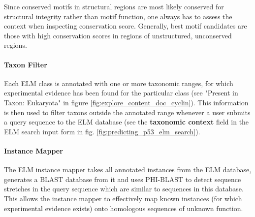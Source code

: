 \documentclass[12pt]{article}
\newcommand\button[1]{%
	\textbf{#1}%
}
\begin{document}
Since conserved motifs in structural regions are most likely conserved for
structural integrity rather than motif function, one always has to assess the
context when inspecting conservation score. Generally, best motif candidates
are those with high conservation scores in regions of unstructured, unconserved
regions.


%

\paragraph*{Taxon Filter}\label{TaxonFilter}

Each ELM class is annotated with one or more taxonomic ranges, for which
experimental evidence has been found for the particular class
(see "Present in Taxon: Eukaryota" in figure
\ref{fig:explore_content_doc_cyclin}). This information is then used to filter taxons
outside the annotated range whenever a user submits a query sequence to the ELM
database (see the \button{taxonomic context} field in the ELM search input form in fig.
\ref{fig:predicting_p53_elm_search}).

\paragraph*{Instance Mapper}\label{InstanceMapper}

The ELM instance mapper takes all annotated instances from the ELM database,
generates a BLAST database from it and uses PHI-BLAST \citep{9705509}
to detect sequence stretches in
the query sequence which are similar to sequences in this database. This allows
the instance mapper to effectively map known instances (for which experimental
evidence exists) onto homologous sequences of unknown function.
\end{document}

